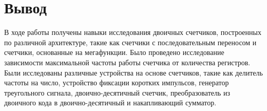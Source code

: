 \documentclass[a4paper,12pt]{article}
\begin{document}
    \section{Вывод}
    В ходе работы получены навыки исследования двоичных счетчиков, построенных по различной архитектуре,
    такие как счетчики с последовательным переносом и счетчики, основанные на мегафункции. Было проведено
    исследование зависимости максимальной частоты работы счетчика от количества регистров. Были исследованы
    различные устройства на основе счетчиков, такие как делитель частоты на число, устройство фиксации коротких
    импульсов, генератор треугольного сигнала, двоично-десятичный счетчик, преобразователь из двоичного кода в
    двоично-десятичный и накапливающий сумматор.
\end{document}
